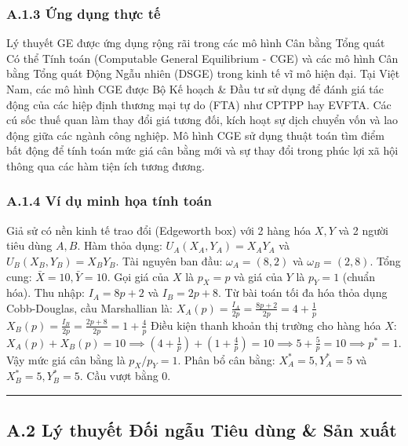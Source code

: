 \documentclass[
]{article}
\begin{document}
\subsubsection{A.1.3 Ứng dụng thực
tế}\label{a.1.3-ux1ee9ng-dux1ee5ng-thux1ef1c-tux1ebf}

Lý thuyết GE được ứng dụng rộng rãi trong các mô hình Cân bằng Tổng quát
Có thể Tính toán (Computable General Equilibrium - CGE) và các mô hình
Cân bằng Tổng quát Động Ngẫu nhiên (DSGE) trong kinh tế vĩ mô hiện đại.
Tại Việt Nam, các mô hình CGE được Bộ Kế hoạch \& Đầu tư sử dụng để đánh
giá tác động của các hiệp định thương mại tự do (FTA) như CPTPP hay
EVFTA. Các cú sốc thuế quan làm thay đổi giá tương đối, kích hoạt sự
dịch chuyển vốn và lao động giữa các ngành công nghiệp. Mô hình CGE sử
dụng thuật toán tìm điểm bất động để tính toán mức giá cân bằng mới và
sự thay đổi trong phúc lợi xã hội thông qua các hàm tiện ích tương
đương.

\subsubsection{A.1.4 Ví dụ minh họa tính
toán}\label{a.1.4-vuxed-dux1ee5-minh-hux1ecda-tuxednh-touxe1n}

Giả sử có nền kinh tế trao đổi (Edgeworth box) với 2 hàng hóa \(X, Y\)
và 2 người tiêu dùng \(A, B\). Hàm thỏa dụng:
\(U_A(X_A, Y_A) = X_A Y_A\) và \(U_B(X_B, Y_B) = X_B Y_B\). Tài nguyên
ban đầu: \(\omega_A = (8, 2)\) và \(\omega_B = (2, 8)\). Tổng cung:
\(\bar{X} = 10, \bar{Y} = 10\). Gọi giá của \(X\) là \(p_X = p\) và giá
của \(Y\) là \(p_Y = 1\) (chuẩn hóa). Thu nhập: \(I_A = 8p + 2\) và
\(I_B = 2p + 8\). Từ bài toán tối đa hóa thỏa dụng Cobb-Douglas, cầu
Marshallian là:
\(X_A(p) = \frac{I_A}{2p} = \frac{8p + 2}{2p} = 4 + \frac{1}{p}\)
\(X_B(p) = \frac{I_B}{2p} = \frac{2p + 8}{2p} = 1 + \frac{4}{p}\) Điều
kiện thanh khoản thị trường cho hàng hóa \(X\):
\(X_A(p) + X_B(p) = 10 \implies (4 + \frac{1}{p}) + (1 + \frac{4}{p}) = 10 \implies 5 + \frac{5}{p} = 10 \implies p^* = 1\).
Vậy mức giá cân bằng là \(p_X/p_Y = 1\). Phân bổ cân bằng:
\(X_A^* = 5, Y_A^* = 5\) và \(X_B^* = 5, Y_B^* = 5\). Cầu vượt bằng 0.

\begin{center}\rule{0.5\linewidth}{0.5pt}\end{center}

\subsection{A.2 Lý thuyết Đối ngẫu Tiêu dùng \& Sản
xuất}\label{a.2-luxfd-thuyux1ebft-ux111ux1ed1i-ngux1eabu-tiuxeau-duxf9ng-sux1ea3n-xuux1ea5t}
\end{document}

